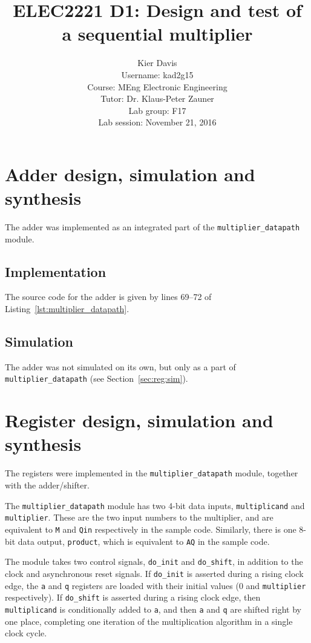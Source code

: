 \documentclass[a4paper]{article}
\title{ELEC2221 D1: Design and test of a sequential multiplier}
\author{Kier Davis \\
Username: kad2g15 \\
Course: MEng Electronic Engineering \\
Tutor: Dr. Klaus-Peter Zauner \\
Lab group: F17 \\
Lab session: November 21, 2016}
\begin{document}
\maketitle

\begin{abstract}
\end{abstract}

\section{Adder design, simulation and synthesis}
\label{sec:adder}

The adder was implemented as an integrated part of the \texttt{multiplier\_datapath} module.

\subsection{Implementation}
\label{sec:adder:impl}

The source code for the adder is given by lines 69--72 of Listing~\ref{lst:multiplier_datapath}.

\subsection{Simulation}
\label{sec:adder:sim}

The adder was not simulated on its own, but only as a part of \texttt{multiplier\_datapath} (see Section~\ref{sec:reg:sim}). 

\section{Register design, simulation and synthesis}
\label{seg:reg}

The registers were implemented in the \texttt{multiplier\_datapath} module, together with the adder/shifter.

The \texttt{multiplier\_datapath} module has two 4-bit data inputs, \texttt{multiplicand} and \texttt{multiplier}. These are the two input numbers to the multiplier, and are equivalent to \texttt{M} and \texttt{Qin} respectively in the sample code. Similarly, there is one 8-bit data output, \texttt{product}, which is equivalent to \texttt{AQ} in the sample code.

The module takes two control signals, \texttt{do\_init} and \texttt{do\_shift}, in addition to the clock and asynchronous reset signals. If \texttt{do\_init} is asserted during a rising clock edge, the \texttt{a} and \texttt{q} registers are loaded with their initial values (0 and \texttt{multiplier} respectively). If \texttt{do\_shift} is asserted during a rising clock edge, then \texttt{multiplicand} is conditionally added to \texttt{a}, and then \texttt{a} and \texttt{q} are shifted right by one place, completing one iteration of the multiplication algorithm in a single clock cycle.
\end{document}
